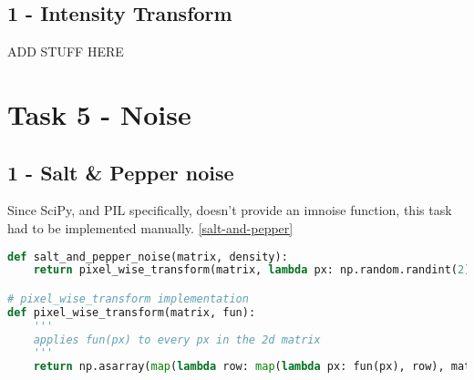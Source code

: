 \subsection*{1 - Intensity Transform}

ADD STUFF HERE

\section*{Task 5 - Noise}

\subsection*{1 - Salt \& Pepper noise}

Since SciPy, and PIL specifically, doesn't provide an imnoise function, this task had to be implemented manually. \ref{salt-and-pepper}

\begin{lstlisting}[language=Python, label=salt-and-pepper, caption=Salt & pepper noise]
def salt_and_pepper_noise(matrix, density):
    return pixel_wise_transform(matrix, lambda px: np.random.randint(2) if np.random.random() < density else px)

# pixel_wise_transform implementation
def pixel_wise_transform(matrix, fun):
    '''
    applies fun(px) to every px in the 2d matrix
    '''
    return np.asarray(map(lambda row: map(lambda px: fun(px), row), matrix))
\end{lstlisting}

